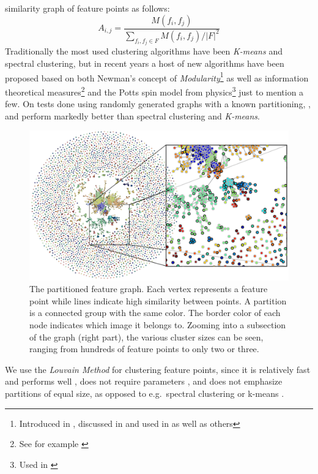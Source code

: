 similarity graph of feature points as follows:
\begin{equation*}
    A_{i,j} = \frac{M(f_i, f_j)}{\sum\limits_{f_i,f_j \in F} M(f_i, f_j) 
    / \left\vert F \right\vert ^ {2}}
\end{equation*}
%
Traditionally the most used clustering algorithms have been 
\emph{K-means} and spectral clustering, but in recent years a host of 
new algorithms have been proposed based on both Newman's concept of 
\emph{Modularity}\footnote{Introduced in \cite{girvan2002}, discussed in 
\cite{brandes2007} and used in \cite{blondel2008} as well as others} as 
well as information theoretical measures\footnote{See for example 
\cite{rosvall2008}} and the Potts spin model from physics\footnote{Used 
in \cite{ronhovde2009}} just to mention a few.  On tests done using 
randomly generated graphs with a known partitioning, \cite{blondel2008}, 
\cite{rosvall2008} and \cite{ronhovde2009} perform markedly better than 
spectral clustering and \emph{K-means}\cite{lancichinetti2009}.
%
\begin{figure}[t]
    \centering
	\includegraphics[width=\textwidth]{images/MMC_graph}
    \caption{The partitioned feature graph. Each vertex represents a 
        feature point while lines indicate high similarity between 
        points.  A partition is a connected group with the same color.  
        The border color of each node indicates which image it belongs 
        to.  Zooming into a subsection of the graph (right part), the 
    various cluster sizes can be seen, ranging from hundreds of feature 
points to only two or three.}
    \label{fig:graph-view}
\end{figure}
%
We use the \emph{Louvain Method} \cite{blondel2008} for clustering 
feature points, since it is relatively fast and performs well 
\cite{lancichinetti2009}, does not require parameters 
\cite{blondel2008}, and does not emphasize partitions of equal size, as 
opposed to e.g.\ spectral clustering or k-means \cite{von2007}.

